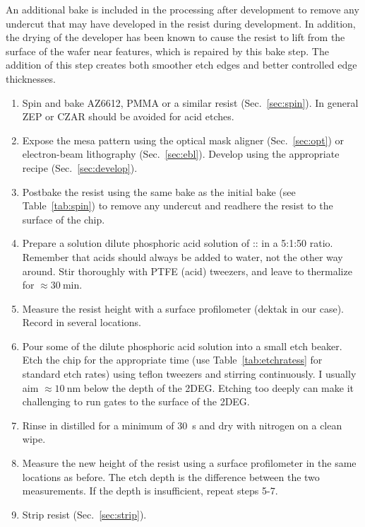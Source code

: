 An additional bake is included in the processing after development to remove any undercut that may have developed in the resist during development.
In addition, the drying of the developer has been known to cause the resist to lift from the surface of the wafer near features, which is repaired
by this bake step. The addition of this step creates both smoother etch edges and better controlled edge thicknesses.

\begin{enumerate}
    \item Spin and bake AZ6612, PMMA or a similar resist (Sec.~\ref{sec:spin}). In general ZEP or CZAR should be avoided for acid etches.
    \item Expose the mesa pattern using the optical mask aligner (Sec.~\ref{sec:opt}) or electron-beam lithography (Sec.~\ref{sec:ebl}). Develop using the appropriate recipe (Sec.~\ref{sec:develop}).
    \item Postbake the resist using the same bake as the initial bake (see Table~\ref{tab:spin}) to remove any undercut and readhere the resist to the surface of the chip.
    \item Prepare a solution dilute phosphoric acid solution of :: in a 5:1:50 ratio. Remember that acids should always be added to water, not the other way around. Stir thoroughly with PTFE (acid) tweezers, and leave to thermalize for $\approx \SI{30}{\minute}$.
    \item Measure the resist height with a surface profilometer (dektak in our case). Record in several locations.
    \item Pour some of the dilute phosphoric acid solution into a small etch beaker. Etch the chip for the appropriate time (use Table~\ref{tab:etchratess} for standard etch rates) using teflon tweezers and stirring continuously. I usually aim $\approx \SI{10}{\nano\meter}$ below the depth of the 2DEG. Etching too deeply can make it challenging to run gates to the surface of the 2DEG.
    \item Rinse in distilled  for a minimum of \SI{30}{\second} and dry with nitrogen on a clean wipe.
    \item Measure the new height of the resist using a surface profilometer in the same locations as before. The etch depth is the difference between the two measurements. If the depth is insufficient, repeat steps 5-7.
    \item Strip resist (Sec.~\ref{sec:strip}).
\end{enumerate}


